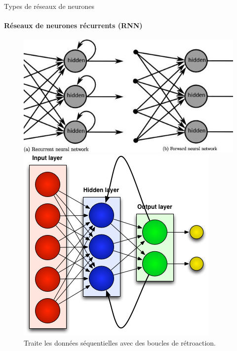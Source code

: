 \documentclass{beamer}
\begin{document}
\begin{frame}{Types de réseaux de neurones}
	\framesubtitle{Réseaux de neurones récurrents (RNN)}
	\begin{figure}[h]
		\centering
		\begin{minipage}{0.5\textwidth}
			\centering
			\includegraphics[width=\linewidth]{rnn.jpeg}
		\end{minipage}\hfill
		\begin{minipage}{0.5\textwidth}
			\centering
			\includegraphics[width=\linewidth]{rnnp.png}
		\end{minipage}
		\caption{Traite les données séquentielles avec des boucles de rétroaction.}
	\end{figure}
\end{frame}	
\end{document}
